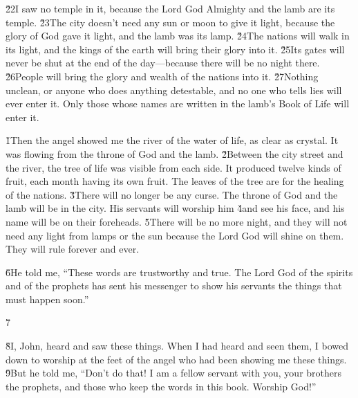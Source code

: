 \v{22}I saw no temple in it, because the Lord God Almighty and the lamb are its temple. \v{23}The city doesn't need any sun or moon to give it light, because the glory of God gave it light, and the lamb was its lamp. \v{24}The nations will walk in its light, and the kings of the earth will bring their glory into it. \v{25}Its gates will never be shut at the end of the day---because there will be no night there. \v{26}People will bring the glory and wealth of the nations into it. \v{27}Nothing unclean, or anyone who does anything detestable, and no one who tells lies will ever enter it. Only those whose names are written in the lamb's Book of Life will enter it.

\v{1}Then the angel showed me the river of the water of life, as clear as crystal. It was flowing from the throne of God and the lamb. \v{2}Between the city street and the river, the tree of life was visible from each side. It produced twelve kinds of fruit, each month having its own fruit. The leaves of the tree are for the healing of the nations. \v{3}There will no longer be any curse. The throne of God and the lamb will be in the city. His servants will worship him \v{4}and see his face, and his name will be on their foreheads. \v{5}There will be no more night, and they will not need any light from lamps or the sun because the Lord God will shine on them. They will rule forever and ever.

\v{6}He told me, ``These words are trustworthy and true. The Lord God of the spirits and of the prophets has sent his messenger to show his servants the things that must happen soon.''

\v{7}

\v{8}I, John, heard and saw these things. When I had heard and seen them, I bowed down to worship at the feet of the angel who had been showing me these things. \v{9}But he told me, ``Don't do that! I am a fellow servant with you, your brothers the prophets, and those who keep the words in this book. Worship God!''

